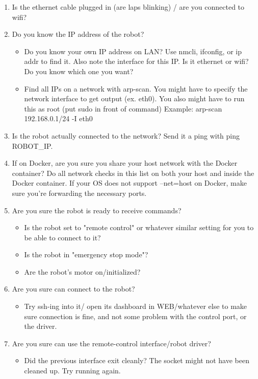 \begin{enumerate}
	\item Is the ethernet cable plugged in (are laps blinking) / are you connected to wifi?
	\item Do you know the IP address of the robot?
\begin{itemize}
	\item Do you know your own IP address on LAN?
		Use nmcli, ifconfig, or ip addr to find it. 
		Also note the interface for this IP. Is it ethernet or wifi? Do you know which one you want?
	\item Find all IPs on a network with arp-scan. 
		You might have to specify the network interface to get output (ex. eth0). 
		You also might have to run this as root (put sudo in front of command)
		Example:
		\newline
		arp-scan 192.168.0.1/24 -I eth0
\end{itemize}
\item Is the robot actually connected to the network? Send it a ping with ping ROBOT\_IP.
\item If on Docker, are you sure you share your host network with the Docker container?
	Do all network checks in this list on both your host and inside the Docker container.
	If your OS does not support --net=host on Docker, make sure you're forwarding the necessary ports.
\item Are you sure the robot is ready to receive commands?
\begin{itemize}
\item Is the robot set to "remote control" or whatever similar setting for you to be able to connect to it?
\item Is the robot in "emergency stop mode"?
\item Are the robot's motor on/initialized?
\end{itemize}
\item Are you sure can connect to the robot? 
\begin{itemize}
	\item Try ssh-ing into it/ open its dashboard in WEB/whatever else to make sure connection is fine, and not some problem with 
		the control port, or the driver. 
\end{itemize}
\item Are you sure can use the remote-control interface/robot driver? 
\begin{itemize}
	\item Did the previous interface exit cleanly? The socket might not have been cleaned up. Try running again. 

\end{itemize}
\end{enumerate}
